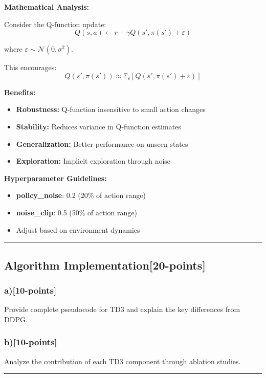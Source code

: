 \documentclass[12pt]{article}
\begin{document}
{{\textbf{Mathematical Analysis:}

Consider the Q-function update:
\begin{equation}
Q(s,a) \leftarrow r + \gamma Q(s', \pi(s') + \varepsilon)
\end{equation}

where $\varepsilon \sim \mathcal{N}(0, \sigma^2)$.

This encourages:
\begin{equation}
Q(s', \pi(s')) \approx \mathbb{E}_\varepsilon[Q(s', \pi(s') + \varepsilon)]
\end{equation}

\textbf{Benefits:}
\begin{itemize}
\item \textbf{Robustness:} Q-function insensitive to small action changes
\item \textbf{Stability:} Reduces variance in Q-function estimates
\item \textbf{Generalization:} Better performance on unseen states
\item \textbf{Exploration:} Implicit exploration through noise
\end{itemize}

\textbf{Hyperparameter Guidelines:}
\begin{itemize}
\item \textbf{policy\_noise}: 0.2 (20\% of action range)
\item \textbf{noise\_clip}: 0.5 (50\% of action range)
\item Adjust based on environment dynamics
\end{itemize}

\noindent\rule{\textwidth}{0.2pt}

\subsection{Algorithm Implementation[20-points]}
\subsubsection{a)[10-points]} Provide complete pseudocode for TD3 and explain the key differences from DDPG.

\subsubsection{b)[10-points]} Analyze the contribution of each TD3 component through ablation studies.

\noindent\rule{\textwidth}{0.2pt}
}}
\end{document}
